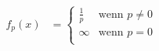 \documentclass[12pt,a5paper]{book}
\begin{document}
\begin{align*}
f_p(x) & =
\begin{cases}
\frac{1}{p} & \textrm{wenn } p \neq 0 \\
\infty
& \textrm{wenn } p = 0 \\
\end{cases}
\end{align*}
\end{document}
